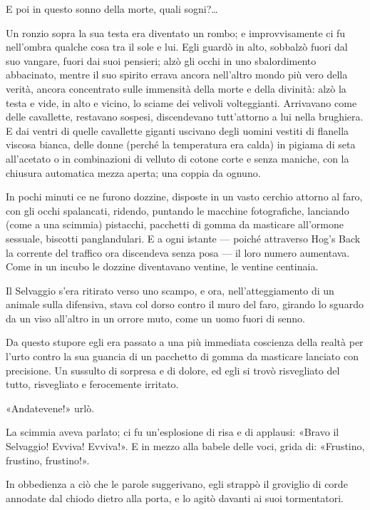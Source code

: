 \documentclass[
a5paper, %
10pt, %
twoside, 
onecolumn, %
openany, %
]{memoir}
\begin{document}
E poi in questo sonno della morte, quali sogni?…

Un ronzio sopra la sua testa era diventato un rombo; e improvvisamente ci fu nell’ombra qualche cosa tra il sole e lui. Egli guardò in alto, sobbalzò fuori dal suo vangare, fuori dai suoi pensieri; alzò gli occhi in uno sbalordimento abbacinato, mentre il suo spirito errava ancora nell’altro mondo più vero della verità, ancora concentrato sulle immensità della morte e della divinità: alzò la testa e vide, in alto e vicino, lo sciame dei velivoli volteggianti. Arrivavano come delle cavallette, restavano sospesi, discendevano tutt’attorno a lui nella brughiera. E dai ventri di quelle cavallette giganti uscivano degli uomini vestiti di flanella viscosa bianca, delle donne (perché la temperatura era calda) in pigiama di seta all’acetato o in combinazioni di velluto di cotone corte e senza maniche, con la chiusura automatica mezza aperta; una coppia da ognuno.

In pochi minuti ce ne furono dozzine, disposte in un vasto cerchio attorno al faro, con gli occhi spalancati, ridendo, puntando le macchine fotografiche, lanciando (come a una scimmia) pistacchi, pacchetti di gomma da masticare all’ormone sessuale, biscotti panglandulari. E a ogni istante — poiché attraverso Hog’s Back la corrente del traffico ora discendeva senza posa — il loro numero aumentava. Come in un incubo le dozzine diventavano ventine, le ventine centinaia.

Il Selvaggio s’era ritirato verso uno scampo, e ora, nell’atteggiamento di un animale sulla difensiva, stava col dorso contro il muro del faro, girando lo sguardo da un viso all’altro in un orrore muto, come un uomo fuori di senno.

Da questo stupore egli era passato a una più immediata coscienza della realtà per l’urto contro la sua guancia di un pacchetto di gomma da masticare lanciato con precisione. Un sussulto di sorpresa e di dolore, ed egli si trovò risvegliato del tutto, risvegliato e ferocemente irritato.

«Andatevene!» urlò.

La scimmia aveva parlato; ci fu un’esplosione di risa e di applausi: «Bravo il Selvaggio! Evviva! Evviva!». E in mezzo alla babele delle voci, grida di: «Frustino, frustino, frustino!».

In obbedienza a ciò che le parole suggerivano, egli strappò il groviglio di corde annodate dal chiodo dietro alla porta, e lo agitò davanti ai suoi tormentatori.
\end{document}

